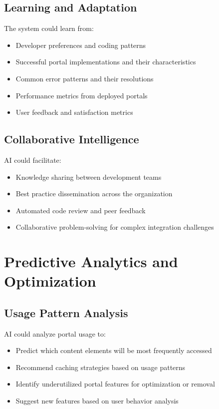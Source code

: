 \subsection{Learning and Adaptation}

The system could learn from:
\begin{itemize}
\item Developer preferences and coding patterns
\item Successful portal implementations and their characteristics
\item Common error patterns and their resolutions
\item Performance metrics from deployed portals
\item User feedback and satisfaction metrics
\end{itemize}

\subsection{Collaborative Intelligence}

AI could facilitate:
\begin{itemize}
\item Knowledge sharing between development teams
\item Best practice dissemination across the organization
\item Automated code review and peer feedback
\item Collaborative problem-solving for complex integration challenges
\end{itemize}

\section{Predictive Analytics and Optimization}
\label{sec:predictive-analytics}

\subsection{Usage Pattern Analysis}

AI could analyze portal usage to:
\begin{itemize}
\item Predict which content elements will be most frequently accessed
\item Recommend caching strategies based on usage patterns
\item Identify underutilized portal features for optimization or removal
\item Suggest new features based on user behavior analysis
\end{itemize}

